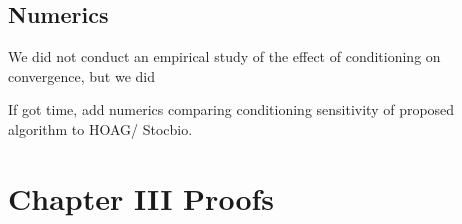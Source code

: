 \documentclass[11pt, twoside]{report}
\begin{document}

\section{Numerics}
We did not conduct an empirical study of the effect of conditioning on convergence, but we did
\begin{mdframed}[hidealllines=true,backgroundcolor=yellow!20]
    If got time, add numerics comparing conditioning sensitivity of proposed algorithm to HOAG/ Stocbio.
\end{mdframed}





\appendix

\chapter{Chapter III Proofs}
\label{Bayesian_proofs}
\end{document}
